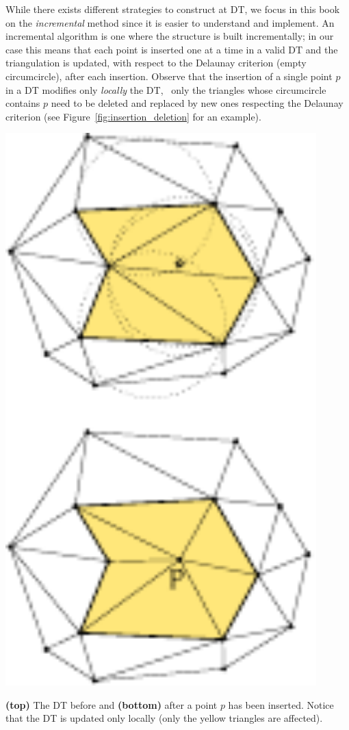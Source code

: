 While there exists different strategies to construct at DT, we focus in this book on the \emph{incremental} method since it is easier to understand and implement.
An incremental algorithm is one where the structure is built incrementally; in our case this means that each point is inserted one at a time in a valid DT and the triangulation is updated, with respect to the Delaunay criterion (empty circumcircle), after each insertion. 
Observe that the insertion of a single point $p$ in a DT modifies only \emph{locally} the DT, \ie\ only the triangles whose circumcircle contains $p$ need to be deleted and replaced by new ones respecting the Delaunay criterion (see Figure~\ref{fig:insertion_deletion} for an example). 
\begin{marginfigure}
  \centering
  \includegraphics[width=0.9\textwidth]{figs/insertion_deletion}
  \caption{\textbf{(top)} The DT before and \textbf{(bottom)} after a point $p$ has been inserted. Notice that the DT is updated only locally (only the yellow triangles are affected).}%
\label{fig:insertion_deletion}
\end{marginfigure}

